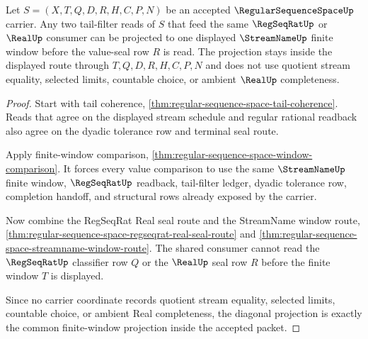 \begin{theorem}
\label{thm:regular-sequence-space-tail-diagonal-projection}
Let $S=(X,T,Q,D,R,H,C,P,N)$ be an accepted $\RegularSequenceSpaceUp$ carrier. Any two tail-filter reads of $S$ that feed the same $\RegSeqRatUp$ or $\RealUp$ consumer can be projected to one displayed $\StreamNameUp$ finite window before the value-seal row $R$ is read. The projection stays inside the displayed route through $T,Q,D,R,H,C,P,N$ and does not use quotient stream equality, selected limits, countable choice, or ambient $\RealUp$ completeness.
\end{theorem}
\begin{proof}
Start with tail coherence, \autoref{thm:regular-sequence-space-tail-coherence}. Reads that agree on the displayed stream schedule and regular rational readback also agree on the dyadic tolerance row and terminal seal route.

Apply finite-window comparison, \autoref{thm:regular-sequence-space-window-comparison}. It forces every value comparison to use the same $\StreamNameUp$ finite window, $\RegSeqRatUp$ readback, tail-filter ledger, dyadic tolerance row, completion handoff, and structural rows already exposed by the carrier.

Now combine the RegSeqRat Real seal route and the StreamName window route, \autoref{thm:regular-sequence-space-regseqrat-real-seal-route} and \autoref{thm:regular-sequence-space-streamname-window-route}. The shared consumer cannot read the $\RegSeqRatUp$ classifier row $Q$ or the $\RealUp$ seal row $R$ before the finite window $T$ is displayed.

Since no carrier coordinate records quotient stream equality, selected limits, countable choice, or ambient Real completeness, the diagonal projection is exactly the common finite-window projection inside the accepted packet.
\end{proof}

